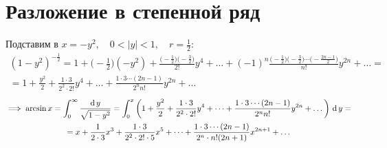 \section{Разложение в степенной ряд }

Подставим в  $ x = -y^2, \quad 0 < |y| < 1, \quad r = \frac12 $:
\begin{multline*}
	(1 - y^2)^{-\frac12} = 1 + \bigg( -\frac12 \bigg) (-y^2) + \frac{\big( -\frac12 \big)\big( -\frac32 \big)}{2!}y^4 + \dots + (-1)^n \frac{\big( -\frac12 \big) \big( -\frac32 \big) \cdots \big( -\frac{2n - 1}2 \big)}{n!}y^{2n} + \dots = \\
	= 1 + \frac{y^2}2 + \frac{1 \cdot 3}{2^2 \cdot 2!}y^4 + \dots + \frac{1 \cdot 3 \cdots (2n - 1)}{2^nn!}y^{2n} + \dots
\end{multline*}
\begin{multline*}
	\implies \arcsin x = \dfint[y]0\infty{\sqrt{1 - y^2}} = \dint[y]0x{\bigg( 1 + \frac{y^2}2 + \frac{1 \cdot 3}{2^2 \cdot 2!}y^4 + \dots + \frac{1 \cdot 3 \cdots (2n - 1)}{2^nn!}y^{2n} + \dots \bigg)} = \\
	= x + \frac1{2 \cdot 3}x^3 + \frac{1 \cdot 3}{2^2 \cdot 2! \cdot 5}x^5 + \dots + \frac{1 \cdot 3 \cdots (2n - 1)}{2^n \cdot n!(2n + 1)}x^{2n + 1} + \dots
\end{multline*}
